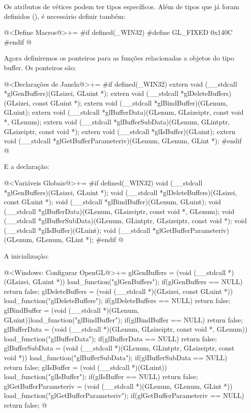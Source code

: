 Os atributos de vétices podem ter tipos específicos. Além de tipos que
já foram definidos (), é necessário definir
também:

\iniciocodigo
@<Define Macros@>+=
#if defined(_WIN32)
#define GL_FIXED          0x140C
#endif
@
\fimcodigo

Agora definiremos os ponteiros para as funções relacionadas a objetos
do tipo buffer. Os ponteiros são:

\iniciocodigo
@<Declarações de Janela@>+=
#if defined(_WIN32)
extern void (__stdcall *glGenBuffers)(GLsizei, GLuint *);
extern void (__stdcall *glDeleteBuffers)(GLsizei, const GLuint *);
extern void (__stdcall *glBindBuffer)(GLenum, GLuint);
extern void (__stdcall *glBufferData)(GLenum, GLsizeiptr, const void *, GLenum);
extern void (__stdcall *glBufferSubData)(GLenum, GLintptr, GLsizeiptr,
                                         const void *);
extern void (__stdcall *glIsBuffer)(GLuint);
extern void (__stdcall *glGetBufferParameteriv)(GLenum, GLenum, GLint *);
#endif
@
\fimcodigo

E a declaração:

\iniciocodigo
@<Variáveis Globais@>+=
#if defined(_WIN32)
void (__stdcall *glGenBuffers)(GLsizei, GLuint *);
void (__stdcall *glDeleteBuffers)(GLsizei, const GLuint *);
void (__stdcall *glBindBuffer)(GLenum, GLuint);
void (__stdcall *glBufferData)(GLenum, GLsizeiptr, const void *, GLenum);
void (__stdcall *glBufferSubData)(GLenum, GLintptr, GLsizeiptr, const void *);
void (__stdcall *glIsBuffer)(GLuint);
void (__stdcall *glGetBufferParameteriv)(GLenum, GLenum, GLint *);
#endif
@
\fimcodigo

A inicialização:

\iniciocodigo
@<Windows: Configurar OpenGL@>+=
glGenBuffers = (void (__stdcall *)(GLsizei, GLuint *))
                 load_function("glGenBuffers");
if(glGenBuffers == NULL) return false;
glDeleteBuffers = (void (__stdcall *)(GLsizei, const GLuint *))
                    load_function("glDeleteBuffers");
if(glDeleteBuffers == NULL) return false;
glBindBuffer = (void (__stdcall *)(GLenum, GLuint))load_function("glBindBuffer");
if(glBindBuffer == NULL) return false;
glBufferData = (void (__stdcall *)(GLenum, GLsizeiptr, const void *, GLenum))
                 load_function("glBufferData");
if(glBufferData == NULL) return false;
glBufferSubData = (void (__stdcall *)(GLenum, GLintptr, GLsizeiptr, const void *))
                    load_function("glBufferSubData");
if(glBufferSubData == NULL) return false;
glIsBuffer = (void (__stdcall *)(GLuint)) load_function("glIsBuffer");
if(glIsBuffer == NULL) return false;
glGetBufferParameteriv = (void (__stdcall *)(GLenum, GLenum, GLint *))
                           load_function("glGetBufferParameteriv");
if(glGetBufferParameteriv == NULL) return false;
@
\fimcodigo

